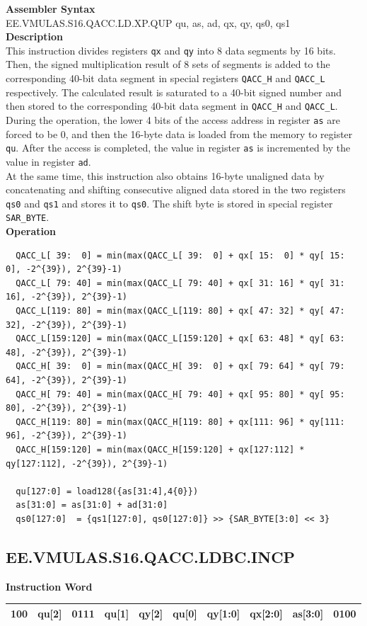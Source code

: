 \textbf{Assembler Syntax} \\
EE.VMULAS.S16.QACC.LD.XP.QUP qu, as, ad, qx, qy, qs0, qs1 \\
\textbf{Description} \\
This instruction divides registers \lstinline{qx} and \lstinline{qy} into 8 data segments by 16 bits. Then, the signed multiplication result of 8 sets of segments is added to the corresponding 40-bit data segment in special registers \lstinline{QACC_H} and \lstinline{QACC_L} respectively. The calculated result is saturated to a 40-bit signed number and then stored to the corresponding 40-bit data segment in \lstinline{QACC_H} and \lstinline{QACC_L}.\\
During the operation, the lower 4 bits of the access address in register \lstinline{as} are forced to be 0, and then the 16-byte data is loaded from the memory to register \lstinline{qu}. After the access is completed, the value in register \lstinline{as} is incremented by the value in register \lstinline{ad}.\\
At the same time, this instruction also obtains 16-byte unaligned data by concatenating and shifting consecutive aligned data stored in the two registers \lstinline{qs0} and \lstinline{qs1} and stores it to \lstinline{qs0}. The shift byte is stored in special register \lstinline{SAR_BYTE}.\\
\textbf{Operation}
\begin{lstlisting}
  QACC_L[ 39:  0] = min(max(QACC_L[ 39:  0] + qx[ 15:  0] * qy[ 15:  0], -2^{39}), 2^{39}-1)
  QACC_L[ 79: 40] = min(max(QACC_L[ 79: 40] + qx[ 31: 16] * qy[ 31: 16], -2^{39}), 2^{39}-1)
  QACC_L[119: 80] = min(max(QACC_L[119: 80] + qx[ 47: 32] * qy[ 47: 32], -2^{39}), 2^{39}-1)
  QACC_L[159:120] = min(max(QACC_L[159:120] + qx[ 63: 48] * qy[ 63: 48], -2^{39}), 2^{39}-1)
  QACC_H[ 39:  0] = min(max(QACC_H[ 39:  0] + qx[ 79: 64] * qy[ 79: 64], -2^{39}), 2^{39}-1)
  QACC_H[ 79: 40] = min(max(QACC_H[ 79: 40] + qx[ 95: 80] * qy[ 95: 80], -2^{39}), 2^{39}-1)
  QACC_H[119: 80] = min(max(QACC_H[119: 80] + qx[111: 96] * qy[111: 96], -2^{39}), 2^{39}-1)
  QACC_H[159:120] = min(max(QACC_H[159:120] + qx[127:112] * qy[127:112], -2^{39}), 2^{39}-1)

  qu[127:0] = load128({as[31:4],4{0}})
  as[31:0] = as[31:0] + ad[31:0]
  qs0[127:0]  = {qs1[127:0], qs0[127:0]} >> {SAR_BYTE[3:0] << 3}
\end{lstlisting}

\clearpage
\subsection{EE.VMULAS.S16.QACC.LDBC.INCP}\label{instruction:EEVMULASS16QACCLDBCINCP}
\setlength\tabcolsep{6pt}
\textbf{Instruction Word} \\
\begin{tabular}{|c|c|c|c|c|c|c|c|c|c|}
	\hline
	100 & qu[2] & 0111 & qu[1] & qy[2] & qu[0] & qy[1:0] & qx[2:0] & as[3:0] & 0100 \\
	\hline
\end{tabular}

